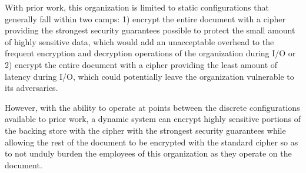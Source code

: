 With prior work, this organization is limited to static configurations that
generally fall within two camps: 1) encrypt the entire document with a cipher
providing the strongest security guarantees possible to protect the small amount
of highly sensitive data, which would add an unacceptable overhead to the
frequent encryption and decryption operations of the organization during I/O or
2) encrypt the entire document with a cipher providing the least amount of
latency during I/O, which could potentially leave the organization vulnerable to
its adversaries.

However, with the ability to operate at points between the discrete
configurations available to prior work, a dynamic system can encrypt highly
sensitive portions of the backing store with the cipher with the strongest
security guarantees while allowing the rest of the document to be encrypted with
the standard cipher so as to not unduly burden the employees of this
organization as they operate on the document.
